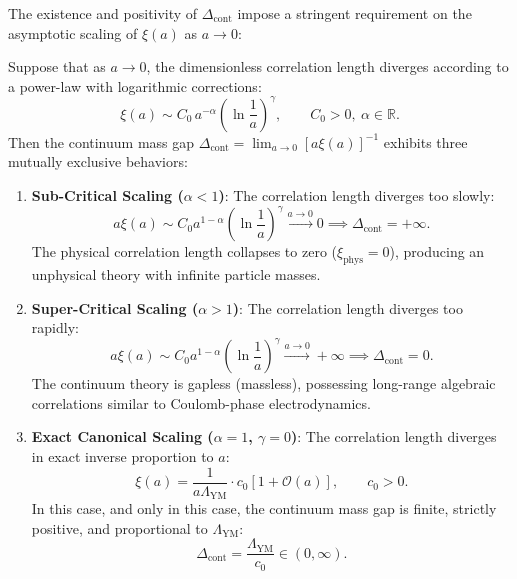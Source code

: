 The existence and positivity of $\Delta_{\mathrm{cont}}$ impose a stringent requirement on the asymptotic scaling of $\xi(a)$ as $a \to 0$:
\begin{proposition}
\label{prop:scaling_classification}
Suppose that as $a \to 0$, the dimensionless correlation length diverges according to a power-law with logarithmic corrections:
\begin{equation}
\label{eq:power_law_scaling}
\xi(a) \sim C_0 \, a^{-\alpha} \left( \ln \frac{1}{a} \right)^\gamma, \qquad C_0 > 0, \ \alpha \in \mathbb{R}.
\end{equation}
Then the continuum mass gap $\Delta_{\mathrm{cont}} = \lim_{a \to 0} [a \xi(a)]^{-1}$ exhibits three mutually exclusive behaviors:
\begin{enumerate}
    \item \textbf{Sub-Critical Scaling ($\alpha < 1$)}: The correlation length diverges too slowly:
    \begin{equation}
    a \xi(a) \sim C_0 a^{1-\alpha} \left( \ln \frac{1}{a} \right)^\gamma \xrightarrow{a \to 0} 0 \implies \Delta_{\mathrm{cont}} = +\infty.
    \end{equation}
    The physical correlation length collapses to zero ($\xi_{\mathrm{phys}} = 0$), producing an unphysical theory with infinite particle masses.
    
    \item \textbf{Super-Critical Scaling ($\alpha > 1$)}: The correlation length diverges too rapidly:
    \begin{equation}
    a \xi(a) \sim C_0 a^{1-\alpha} \left( \ln \frac{1}{a} \right)^\gamma \xrightarrow{a \to 0} +\infty \implies \Delta_{\mathrm{cont}} = 0.
    \end{equation}
    The continuum theory is gapless (massless), possessing long-range algebraic correlations similar to Coulomb-phase electrodynamics.
    
    \item \textbf{Exact Canonical Scaling ($\alpha = 1$, $\gamma = 0$)}: The correlation length diverges in exact inverse proportion to $a$:
    \begin{equation}
    \xi(a) = \frac{1}{a \Lambda_{\mathrm{YM}}} \cdot c_0 \left[ 1 + \mathcal{O}(a) \right], \qquad c_0 > 0.
    \end{equation}
    In this case, and only in this case, the continuum mass gap is finite, strictly positive, and proportional to $\Lambda_{\mathrm{YM}}$:
    \begin{equation}
    \Delta_{\mathrm{cont}} = \frac{\Lambda_{\mathrm{YM}}}{c_0} \in (0, \infty).
    \end{equation}
\end{enumerate}
\end{proposition}


